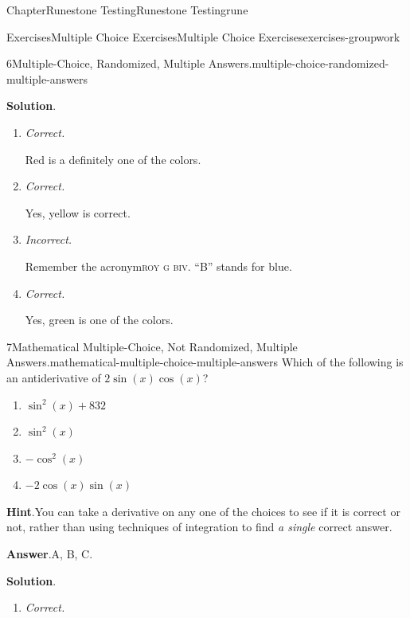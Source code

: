 \documentclass[oneside,10pt,]{book}
\newcommand{\blocktitlefont}{\relax}
\newcommand{\acronym}[1]{\textsc{\MakeLowercase{#1}}}
\newcommand{\lititle}[1]{{\slshape#1}}
\numberwithin{equation}{section}
\begin{document}
\begin{chapterptx}{Chapter}{Runestone Testing}{}{Runestone Testing}{}{}{rune}
\begin{exercises-section}{Exercises}{Multiple Choice Exercises}{}{Multiple Choice Exercises}{}{}{exercises-groupwork}
\begin{divisionexercise}{6}{Multiple-Choice, Randomized, Multiple Answers.}{}{multiple-choice-randomized-multiple-answers}
\par\smallskip%
\noindent\textbf{\blocktitlefont Solution}.\hypertarget{multiple-choice-randomized-multiple-answers-6}{}\quad{}%
\begin{enumerate}[label={\Alph*.}]
\item{}\lititle{Correct.}\par%
Red is a definitely one of the colors.%
\item{}\lititle{Correct.}\par%
Yes, yellow is correct.%
\item{}\lititle{Incorrect.}\par%
Remember the acronym\textellipsis{}\acronym{ROY G BIV}.  ``B'' stands for blue.%
\item{}\lititle{Correct.}\par%
Yes, green is one of the colors.%
\end{enumerate}
%
\end{divisionexercise}%
\begin{divisionexercise}{7}{Mathematical Multiple-Choice, Not Randomized, Multiple Answers.}{}{mathematical-multiple-choice-multiple-answers}%
%
Which of the following is an antiderivative of \(2\sin(x)\cos(x)\)?%
\par
%
\begin{enumerate}[label={\Alph*.}]
\item{}\(\displaystyle \sin^2(x)+832\)%
\item{}\(\displaystyle \sin^2(x)\)%
\item{}\(\displaystyle -\cos^2(x)\)%
\item{}\(\displaystyle -2\cos(x)\sin(x)\)%
\end{enumerate}
%
\par\smallskip%
\noindent\textbf{\blocktitlefont Hint}.\hypertarget{mathematical-multiple-choice-multiple-answers-4}{}\quad{}You can take a derivative on any one of the choices to see if it is correct or not, rather than using techniques of integration to find \emph{a single} correct answer.%
\par\smallskip%
\noindent\textbf{\blocktitlefont Answer}.\hypertarget{mathematical-multiple-choice-multiple-answers-5}{}\quad{}A, B, C.%
\par\smallskip%
\noindent\textbf{\blocktitlefont Solution}.\hypertarget{mathematical-multiple-choice-multiple-answers-6}{}\quad{}%
\begin{enumerate}[label={\Alph*.}]
\item{}\lititle{Correct.}\par%

\end{enumerate}
\end{divisionexercise}
\end{exercises-section}
\end{chapterptx}
\end{document}
